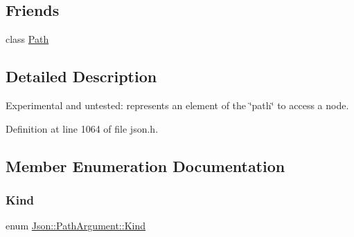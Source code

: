 \subsection*{Friends}
\begin{DoxyCompactItemize}
\item 
class \hyperlink{class_json_1_1_path_argument_a51971c24df68e5ad775ed4f8c33e968f}{Path}
\end{DoxyCompactItemize}


\subsection{Detailed Description}
Experimental and untested\+: represents an element of the \char`\"{}path\char`\"{} to access a node. 

Definition at line 1064 of file json.\+h.



\subsection{Member Enumeration Documentation}
\hypertarget{class_json_1_1_path_argument_a2420bbad778573c147e578701b84d9b9}{}\label{class_json_1_1_path_argument_a2420bbad778573c147e578701b84d9b9} 
\subsubsection{\texorpdfstring{Kind}{Kind}\hspace{0.1cm}{\footnotesize\ttfamily [1/2]}}
{\footnotesize\ttfamily enum \hyperlink{class_json_1_1_path_argument_a2420bbad778573c147e578701b84d9b9}{Json\+::\+Path\+Argument\+::\+Kind}\hspace{0.3cm}{\ttfamily [private]}}

